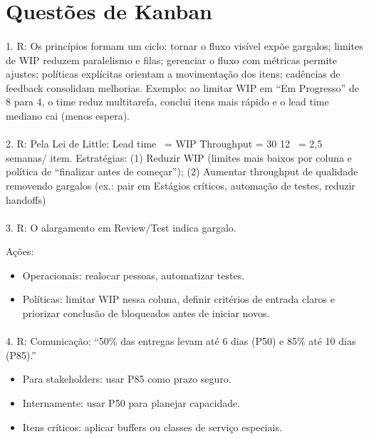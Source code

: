 \documentclass[12pt,a4paper]{article}
\begin{document}
\pagebreak

\section*{Questões de Kanban}

\paragraph{}

1. R: Os princípios formam um ciclo: tornar o fluxo visível expõe gargalos; limites de
WIP reduzem paralelismo e filas; gerenciar o fluxo com métricas permite ajustes; políticas
explícitas orientam a movimentação dos itens; cadências de feedback consolidam melhorias.
Exemplo: ao limitar WIP em “Em Progresso” de 8 para 4, o time reduz multitarefa, conclui
itens mais rápido e o lead time mediano cai (menos espera).

\paragraph{}

2. R: Pela Lei de Little: Lead time ~= WIP Throughput = 30 12 ~= 2,5 semanas/ item.
Estratégias:
(1) Reduzir WIP (limites mais baixos por coluna e política de “finalizar antes
de começar”);
(2) Aumentar throughput de qualidade removendo gargalos (ex.: pair em
Estágios críticos, automação de testes, reduzir handoffs)

\paragraph{}

3. R: O alargamento em Review/Test indica gargalo.

Ações:
\begin{itemize}
    \item Operacionais: realocar pessoas, automatizar testes.
    \item Políticas: limitar WIP nessa coluna, definir critérios de entrada claros e priorizar conclusão de bloqueados antes de iniciar novos.
\end{itemize}

\paragraph{}

4. R: Comunicação: “50\% das entregas levam até 6 dias (P50) e 85\% até 10 dias (P85).”
\begin{itemize}
    \item Para stakeholders: usar P85 como prazo seguro.
    \item Internamente: usar P50 para planejar capacidade.
    \item Itens críticos: aplicar buffers ou classes de serviço especiais.
\end{itemize}
\end{document}
